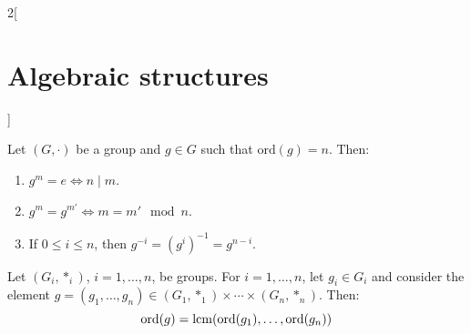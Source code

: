 \documentclass[../../../main_math.tex]{subfiles}
\begin{document}
\begin{multicols}{2}[\section{Algebraic structures}]
\begin{corollary}
  \end{corollary}
  \begin{lemma}
    Let $(G,\cdot)$ be a group and $g\in G$ such that $\text{ord}(g)=n$. Then:
    \begin{enumerate}
      \item $g^m=e\iff n\mid m$.
      \item $g^m=g^{m'}\iff m=m'\mod{n}$.
      \item If $0\leq i\leq n$, then $g^{-i}=(g^i)^{-1}=g^{n-i}$.
    \end{enumerate}
  \end{lemma}
  \begin{corollary}
    Let $(G_i,*_i)$, $i=1,\ldots, n$, be groups. For $i=1,\ldots,n$, let $g_i\in G_i$ and consider the element $g=(g_1,\ldots,g_n)\in(G_1,*_1)\times\cdots\times(G_n,*_n)$. Then: $$\text{ord}(g)=\operatorname{lcm}(\text{ord}(g_1),\ldots,\text{ord}(g_n))$$
  \end{corollary}

\end{multicols}
\end{document}

